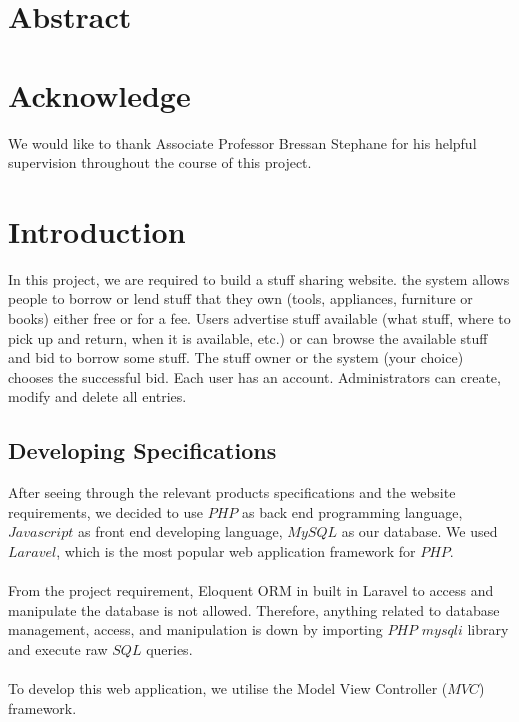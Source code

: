 \section*{Abstract}
\newpage

\section*{Acknowledge}
We would like to thank Associate Professor Bressan Stephane for his helpful supervision
throughout the course of this project.
\newpage
\tableofcontents
\newpage

\section{Introduction}
In this project, we are required to build a stuff sharing website. the system allows people to borrow or lend stuff that they own (tools, appliances, furniture or books) either free or for a fee. Users advertise stuff available (what stuff, where to pick up and return, when it is available, etc.) or can browse the available stuff and bid to borrow some stuff. The stuff owner or the system (your choice) chooses the successful bid. Each user has an account. Administrators can create, modify and delete all entries.
\subsection{Developing Specifications}

After seeing through the relevant products specifications and the website requirements, we decided to use $PHP$ as back end programming language, $Javascript$ as front end developing language, $MySQL$ as our database. We used $Laravel$, which is the most popular web application framework for $PHP$.\\
\\
From the project requirement, Eloquent ORM in built in Laravel to access and manipulate the database is not allowed. Therefore, anything related to database management, access, and manipulation is down by importing $PHP$ $mysqli$ library and execute raw $SQL$ queries.\\
\\
To develop this web application, we utilise the Model View Controller ($MVC$) framework.\\

